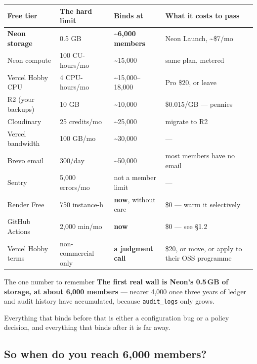 \documentclass[11pt,a4paper]{article}
\newcommand{\hd}[1]{\textbf{\sffamily\small #1}}
\begin{document}
\begin{center}
\begin{tabular}{@{}L{3.9cm}L{3.5cm}L{3.2cm}L{4.1cm}@{}}
\toprule
\hd{Free tier} & \hd{The hard limit} & \hd{Binds at} & \hd{What it costs to pass} \\
\midrule
{} \textbf{Neon storage} & 0.5 GB & \textbf{\textasciitilde6{,}000 members} & Neon Launch, \textasciitilde\$7/mo \\
Neon compute & 100 CU-hours/mo & \textasciitilde15{,}000 & same plan, metered \\
Vercel Hobby CPU & 4 CPU-hours/mo & \textasciitilde15{,}000--18{,}000 & Pro \$20, or leave \\
R2 (your backups) & 10 GB & \textasciitilde10{,}000 & \$0.015/GB --- pennies \\
Cloudinary & 25 credits/mo & \textasciitilde25{,}000 & migrate to R2 \\
Vercel bandwidth & 100 GB/mo & \textasciitilde30{,}000 & --- \\
Brevo email & 300/day & \textasciitilde50{,}000 & most members have no email \\
Sentry & 5{,}000 errors/mo & not a member limit & --- \\
\midrule
Render Free & 750 instance-h & \textbf{now}, without care & \$0 --- warm it selectively \\
GitHub Actions & 2{,}000 min/mo & \textbf{now} & \$0 --- see \S1.2 \\
 Vercel Hobby terms & non-commercial only & \textbf{a judgment call} & \$20, or move, or apply to their OSS programme \\
\bottomrule
\end{tabular}
\end{center}

\begin{keybox}{The one number to remember}
\textbf{The first real wall is Neon's 0.5\,GB of storage, at about 6{,}000 members} --- nearer 4{,}000 once three years of ledger and audit history have accumulated, because \texttt{audit\_logs} only grows.

Everything that binds before that is either a configuration bug or a policy decision, and everything that binds after it is far away.
\end{keybox}

\subsection{So when do you reach 6{,}000 members?}
\end{document}
